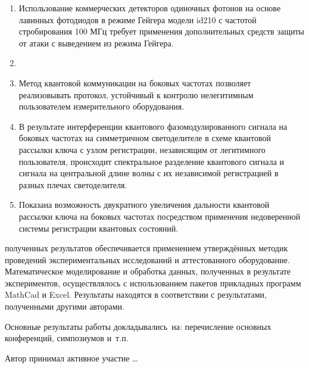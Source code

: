 
{}
\begin{enumerate}
  \item Использование коммерческих детекторов одиночных фотонов на основе лавинных фотодиодов в режиме Гейгера модели id210 с частотой стробирования 100 МГц  требует применения дополнительных средств защиты от атаки с выведением из режима Гейгера.   
  \item {}
  \item Метод квантовой коммуникации на боковых частотах позволяет реализовывать протокол, устойчивый к контролю нелегитимным пользователем измерительного оборудования. 
  \item В результате интерференции квантового фазомодулированного сигнала на боковых частотах на симметричном светоделителе в схеме квантовой рассылки ключа с узлом регистрации, независящим от легитимного пользователя, происходит спектральное разделение квантового сигнала и сигнала на центральной длине волны с их независимой регистрацией в разных плечах светоделителя. 
  \item Показана возможность двукратного увеличения дальности квантовой рассылки ключа на боковых частотах посредством применения недоверенной системы регистрации квантовых состояний. 
\end{enumerate}

{\reliability} полученных результатов обеспечивается применением утверждённых методик проведений экспериментальных исследований и аттестованного оборудование. Математическое моделирование и обработка данных, полученных в результате экспериментов, осуществлялось с использованием пакетов прикладных программ MathCad и Excel. Результаты находятся в соответствии с результатами, полученными другими авторами.


{\probation}
Основные результаты работы докладывались~на:
перечисление основных конференций, симпозиумов и~т.\:п. 

{\contribution} Автор принимал активное участие  \ldots



